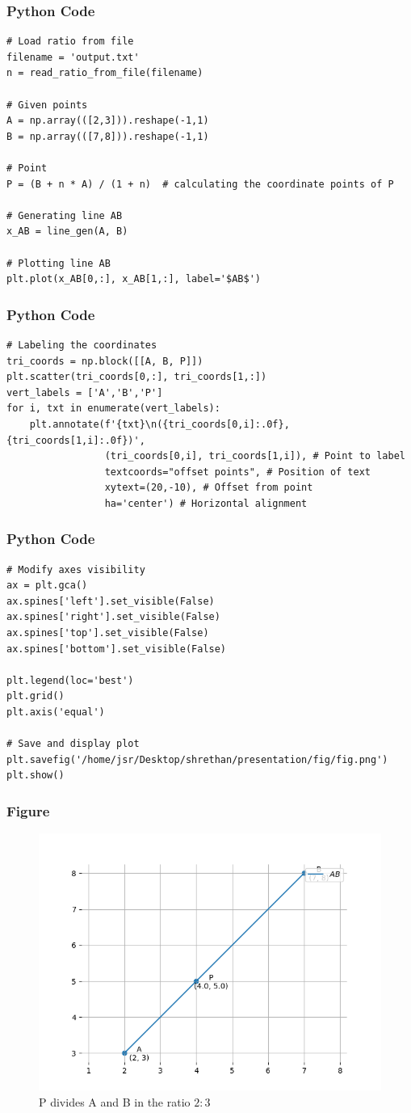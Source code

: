 \documentclass{beamer}
\begin{document}
\begin{frame}[fragile]
  \frametitle{Python Code }

\begin{verbatim}
# Load ratio from file
filename = 'output.txt'
n = read_ratio_from_file(filename)

# Given points
A = np.array(([2,3])).reshape(-1,1)
B = np.array(([7,8])).reshape(-1,1)

# Point
P = (B + n * A) / (1 + n)  # calculating the coordinate points of P

# Generating line AB
x_AB = line_gen(A, B)

# Plotting line AB
plt.plot(x_AB[0,:], x_AB[1,:], label='$AB$')
\end{verbatim}
\end{frame}
\begin{frame}[fragile]
  \frametitle{Python Code }

\begin{verbatim}
# Labeling the coordinates
tri_coords = np.block([[A, B, P]])
plt.scatter(tri_coords[0,:], tri_coords[1,:])
vert_labels = ['A','B','P']
for i, txt in enumerate(vert_labels):
    plt.annotate(f'{txt}\n({tri_coords[0,i]:.0f}, {tri_coords[1,i]:.0f})',
                 (tri_coords[0,i], tri_coords[1,i]), # Point to label
                 textcoords="offset points", # Position of text
                 xytext=(20,-10), # Offset from point
                 ha='center') # Horizontal alignment

\end{verbatim}
\end{frame}
\begin{frame}[fragile]
  \frametitle{Python Code }

\begin{verbatim}
# Modify axes visibility
ax = plt.gca()
ax.spines['left'].set_visible(False)
ax.spines['right'].set_visible(False)
ax.spines['top'].set_visible(False)
ax.spines['bottom'].set_visible(False)

plt.legend(loc='best')
plt.grid() 
plt.axis('equal')

# Save and display plot
plt.savefig('/home/jsr/Desktop/shrethan/presentation/fig/fig.png')
plt.show()
\end{verbatim}
\end{frame}
\begin{frame}
\frametitle{Figure}
\begin{figure}
    \centering
    \includegraphics[width=0.7\linewidth]{fig/fig.png}
    \caption{P divides A and B in the ratio $2:3$}
    \label{fig:enter-label}
\end{figure}
\end{frame}
\end{document}
